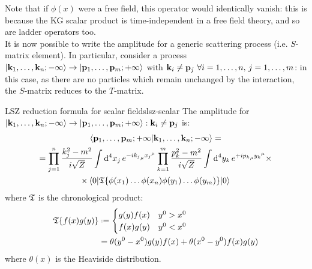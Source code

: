 Note that if $ \phi(x) $ were a free field, this operator would identically vanish: this is because the KG scalar product is time-independent in a free field theory, and so are ladder operators too. \\
It is now possible to write the amplitude for a generic scattering process (i.e. $ S $-matrix element). In particular, consider a process $ \ket{\mathbf{k}_1, \dots, \mathbf{k}_n; -\infty} \rightarrow \ket{\mathbf{p}_1, \dots, \mathbf{p}_m; + \infty} $ with $ \mathbf{k}_i \neq \mathbf{p}_j \,\,\forall i = 1, \dots, n,\, j = 1, \dots, m $: in this case, as there are no particles which remain unchanged by the interaction, the $ S $-matrix reduces to the $ T $-matrix.

\begin{theorem}{LSZ reduction formula for scalar fields}{lsz-scalar}
  The amplitude for $ \ket{\mathbf{k}_1 , \dots , \mathbf{k}_n; -\infty} \rightarrow \ket{\mathbf{p}_1 , \dots , \mathbf{p}_m; +\infty} : \mathbf{k}_i \neq \mathbf{p}_j $ is:
  \begin{multline}
    \braket{\mathbf{p}_1 , \dots , \mathbf{p}_m ; +\infty | \mathbf{k}_1 , \dots , \mathbf{k}_n ; -\infty} = \\
    = \prod_{j = 1}^n \frac{k_j^2 - m^2}{i \sqrt{Z}} \int \mathrm{d}^4x_j\, e^{-i {k_j}_\mu {x_j}^\mu} \prod_{k = 1}^m \frac{p_k^2 - m^2}{i \sqrt{Z}} \int \mathrm{d}^4y_k\, e^{+i {p_k}_\mu {y_k}^\mu} \times \\
    \times \braket{0 | \mathfrak{T}\{\phi(x_1) \dots \phi(x_n) \phi(y_1) \dots \phi(y_m)\} | 0}
    \label{eq:lsz-scalar-field}
  \end{multline}
  where $ \mathfrak{T} $ is the chronological product:
  \begin{equation}
    \begin{split}
      \tempord\{f(x) g(y)\} & \defeq
      \begin{cases}
        g(y) f(x) & y^0 > x^0 \\
        f(x) g(y) & y^0 < x^0
      \end{cases} \\
      & = \theta(y^0 - x^0) g(y) f(x) + \theta(x^0 - y^0) f(x) g(y)
    \end{split}
  \end{equation}
  where $ \theta(x) $ is the Heaviside distribution.
\end{theorem}

